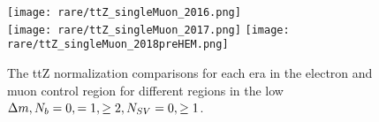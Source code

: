\begin{figure}[!h]
	\begin{center}
  \texttt{[image: rare/ttZ\_singleMuon\_2016.png]} \\
  \texttt{[image: rare/ttZ\_singleMuon\_2017.png]} 
  \texttt{[image: rare/ttZ\_singleMuon\_2018preHEM.png]}

	\end{center}
	\caption[ttZ Normalization Comparisons]{The ttZ normalization comparisons for each era in the electron and muon control region for different regions in the low $\Delta m, N_{b}=0,=1,\geq2, N_{SV}=0,\geq1$.
	 }
	\label{fig:rare-norm-comp}
\end{figure}